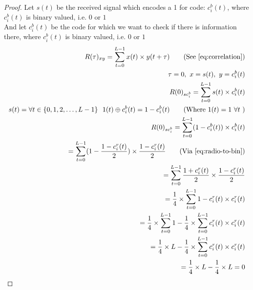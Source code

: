 		\begin{proof}
			Let $s(t)$ be the received signal which encodes a 1 for code: $c^b_i(t)$, where $c^b_i(t)$ is binary valued, i.e. $0$ or $1$ \\
			And let $c^b_i(t)$ be the code for which we want to check if there is information there, where $c^b_i(t)$ is binary valued, i.e. $0$ or $1$ \\

			\begin{align*}
				R(\tau)_{xy} = \displaystyle\sum_{t = 0} ^ {L - 1} x(t) \times y(t + \tau)	\tag{See \autoref{eq:correlation}}
				\\ \tau = 0,\ x = s(t),\ y = c^b_i(t)	
				\\ R(0)_{sc^b_{i}} = \displaystyle\sum_{t = 0} ^ {L - 1} s(t) \times c^b_i(t)	
				\\ s(t) = \forall t \in \{ 0, 1, 2, \dotsc, L - 1 \} \ \ 1(t) \oplus c^b_i(t) = 1 - c^b_i(t) \tag{Where $1(t) = 1 \ \forall t$ }
				\\ R(0)_{sc^b_{i}} = \displaystyle\sum_{t = 0} ^ {L - 1} (1 - c^b_i(t)) \times c^b_i(t)
				\\ = \displaystyle\sum_{t = 0} ^ {L - 1} (1 - \frac{1 - c^r_i(t)}{2}) \times \frac{1 - c^r_i(t)}{2} \tag{Via \autoref{eq:radio-to-bin}}
				\\ = \displaystyle\sum_{t = 0} ^ {L - 1} \frac{1 + c^r_i(t)}{2} \times \frac{1 - c^r_i(t)}{2}
				\\ = \frac{1}{4} \times \displaystyle\sum_{t = 0} ^ {L - 1} 1 - c^r_i(t) \times c^r_i(t)
				\\ = \frac{1}{4} \times \displaystyle\sum_{t = 0} ^ {L - 1} 1 - \frac{1}{4} \times \displaystyle\sum_{t = 0} ^ {L - 1} c^r_i(t) \times c^r_i(t)
				\\ = \frac{1}{4} \times L - \frac{1}{4} \times \displaystyle\sum_{t = 0} ^ {L - 1} c^r_i(t) \times c^r_i(t)
				\\ = \frac{1}{4} \times L - \frac{1}{4} \times L = 0
			\end{align*}

		\end{proof}

